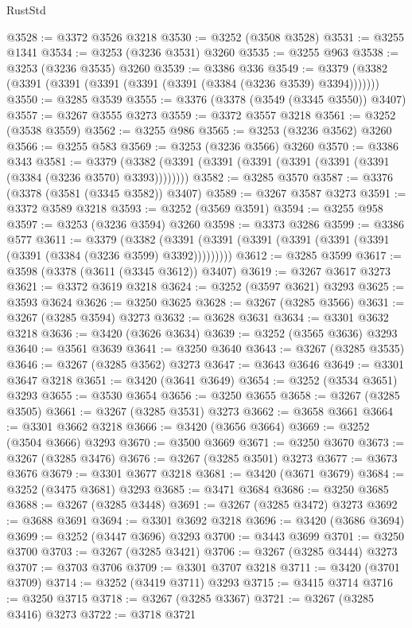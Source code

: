 \begin{lexlean}{RustStd}
\begin{coremodule}
{\begin{coremodule}
{{{{{{{{{{{{{{{{{{{{{{{{{{{{{{{{{{{{{{{@3528 := @3372 @3526 @3218
@3530 := @3252 (@3508 @3528)
@3531 := @3255 @1341
@3534 := @3253 (@3236 @3531) @3260
@3535 := @3255 @963
@3538 := @3253 (@3236 @3535) @3260
@3539 := @3386 @336
@3549 := @3379 (@3382 (@3391 (@3391 (@3391 (@3391 (@3391 (@3384 (@3236 @3539) @3394)))))))
@3550 := @3285 @3539
@3555 := @3376 (@3378 (@3549 (@3345 @3550)) @3407)
@3557 := @3267 @3555 @3273
@3559 := @3372 @3557 @3218
@3561 := @3252 (@3538 @3559)
@3562 := @3255 @986
@3565 := @3253 (@3236 @3562) @3260
@3566 := @3255 @583
@3569 := @3253 (@3236 @3566) @3260
@3570 := @3386 @343
@3581 := @3379 (@3382 (@3391 (@3391 (@3391 (@3391 (@3391 (@3391 (@3384 (@3236 @3570) @3393))))))))
@3582 := @3285 @3570
@3587 := @3376 (@3378 (@3581 (@3345 @3582)) @3407)
@3589 := @3267 @3587 @3273
@3591 := @3372 @3589 @3218
@3593 := @3252 (@3569 @3591)
@3594 := @3255 @958
@3597 := @3253 (@3236 @3594) @3260
@3598 := @3373 @3286
@3599 := @3386 @577
@3611 := @3379
    (@3382 (@3391 (@3391 (@3391 (@3391 (@3391 (@3391 (@3391 (@3384 (@3236 @3599) @3392)))))))))
@3612 := @3285 @3599
@3617 := @3598 (@3378 (@3611 (@3345 @3612)) @3407)
@3619 := @3267 @3617 @3273
@3621 := @3372 @3619 @3218
@3624 := @3252 (@3597 @3621) @3293
@3625 := @3593 @3624
@3626 := @3250 @3625
@3628 := @3267 (@3285 @3566)
@3631 := @3267 (@3285 @3594) @3273
@3632 := @3628 @3631
@3634 := @3301 @3632 @3218
@3636 := @3420 (@3626 @3634)
@3639 := @3252 (@3565 @3636) @3293
@3640 := @3561 @3639
@3641 := @3250 @3640
@3643 := @3267 (@3285 @3535)
@3646 := @3267 (@3285 @3562) @3273
@3647 := @3643 @3646
@3649 := @3301 @3647 @3218
@3651 := @3420 (@3641 @3649)
@3654 := @3252 (@3534 @3651) @3293
@3655 := @3530 @3654
@3656 := @3250 @3655
@3658 := @3267 (@3285 @3505)
@3661 := @3267 (@3285 @3531) @3273
@3662 := @3658 @3661
@3664 := @3301 @3662 @3218
@3666 := @3420 (@3656 @3664)
@3669 := @3252 (@3504 @3666) @3293
@3670 := @3500 @3669
@3671 := @3250 @3670
@3673 := @3267 (@3285 @3476)
@3676 := @3267 (@3285 @3501) @3273
@3677 := @3673 @3676
@3679 := @3301 @3677 @3218
@3681 := @3420 (@3671 @3679)
@3684 := @3252 (@3475 @3681) @3293
@3685 := @3471 @3684
@3686 := @3250 @3685
@3688 := @3267 (@3285 @3448)
@3691 := @3267 (@3285 @3472) @3273
@3692 := @3688 @3691
@3694 := @3301 @3692 @3218
@3696 := @3420 (@3686 @3694)
@3699 := @3252 (@3447 @3696) @3293
@3700 := @3443 @3699
@3701 := @3250 @3700
@3703 := @3267 (@3285 @3421)
@3706 := @3267 (@3285 @3444) @3273
@3707 := @3703 @3706
@3709 := @3301 @3707 @3218
@3711 := @3420 (@3701 @3709)
@3714 := @3252 (@3419 @3711) @3293
@3715 := @3415 @3714
@3716 := @3250 @3715
@3718 := @3267 (@3285 @3367)
@3721 := @3267 (@3285 @3416) @3273
@3722 := @3718 @3721
}}}}}}}}}}}}}}}}}}}}}}}}}}}}}}}}}}}}}}}
\end{coremodule}}
\end{coremodule}
\end{lexlean}
